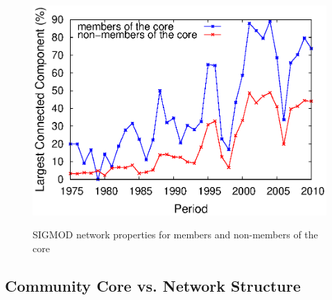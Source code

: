\documentclass[letterpaper]{www13-companion-accepted}
\begin{document}
\begin{figure}[!htpb]
\begin{center}
{    \includegraphics[scale=.31]{graficos/core_over_time/core_community/sigmod_janela_3_core_maior_componente_conectado.eps}
  }
  \end{center}
  \vspace{-0.5cm}
  \caption{SIGMOD network properties for members and non-members of the core}
  \label{fig:metrics_comparing_core_community}
\end{figure}



\subsection{Community Core vs. Network Structure}
\label{sub:corr}
\end{document}
